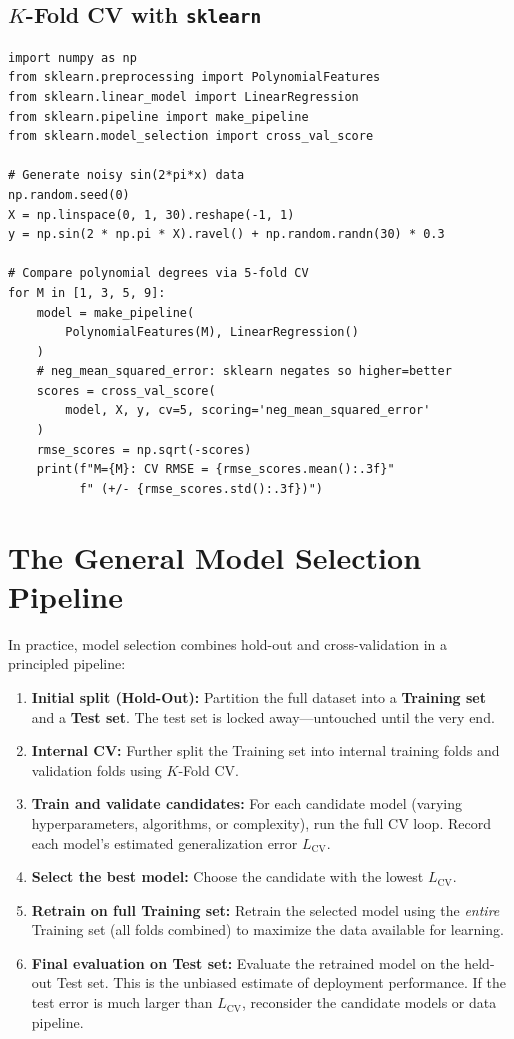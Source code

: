 \subsection*{$K$-Fold CV with \texttt{sklearn}}

\begin{lstlisting}[style=pythonstyle]
import numpy as np
from sklearn.preprocessing import PolynomialFeatures
from sklearn.linear_model import LinearRegression
from sklearn.pipeline import make_pipeline
from sklearn.model_selection import cross_val_score

# Generate noisy sin(2*pi*x) data
np.random.seed(0)
X = np.linspace(0, 1, 30).reshape(-1, 1)
y = np.sin(2 * np.pi * X).ravel() + np.random.randn(30) * 0.3

# Compare polynomial degrees via 5-fold CV
for M in [1, 3, 5, 9]:
    model = make_pipeline(
        PolynomialFeatures(M), LinearRegression()
    )
    # neg_mean_squared_error: sklearn negates so higher=better
    scores = cross_val_score(
        model, X, y, cv=5, scoring='neg_mean_squared_error'
    )
    rmse_scores = np.sqrt(-scores)
    print(f"M={M}: CV RMSE = {rmse_scores.mean():.3f}"
          f" (+/- {rmse_scores.std():.3f})")
\end{lstlisting}

\section*{The General Model Selection Pipeline}

In practice, model selection combines hold-out and cross-validation in a principled pipeline:

\begin{enumerate}
    \item \textbf{Initial split (Hold-Out):} Partition the full dataset into a \textbf{Training set} and a \textbf{Test set}. The test set is locked away---untouched until the very end.
    \item \textbf{Internal CV:} Further split the Training set into internal training folds and validation folds using $K$-Fold CV.
    \item \textbf{Train and validate candidates:} For each candidate model (varying hyperparameters, algorithms, or complexity), run the full CV loop. Record each model's estimated generalization error $L_{\text{CV}}$.
    \item \textbf{Select the best model:} Choose the candidate with the lowest $L_{\text{CV}}$.
    \item \textbf{Retrain on full Training set:} Retrain the selected model using the \textit{entire} Training set (all folds combined) to maximize the data available for learning.
    \item \textbf{Final evaluation on Test set:} Evaluate the retrained model on the held-out Test set. This is the unbiased estimate of deployment performance. If the test error is much larger than $L_{\text{CV}}$, reconsider the candidate models or data pipeline.
\end{enumerate}

